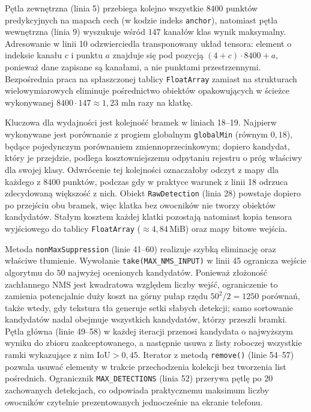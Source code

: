 Pętla zewnętrzna (linia 5) przebiega kolejno wszystkie $8400$ punktów predykcyjnych na mapach cech (w kodzie indeks \texttt{anchor}), natomiast pętla wewnętrzna (linia 9) wyszukuje wśród $147$ kanałów klas wynik maksymalny. Adresowanie w linii 10 odzwierciedla transponowany układ tensora: element o indeksie kanału $c$ i punktu $a$ znajduje się pod pozycją $(4+c)\cdot 8400 + a$, ponieważ dane zapisane są kanałami, a nie punktami przestrzennymi. Bezpośrednia praca na spłaszczonej tablicy \texttt{FloatArray} zamiast na strukturach wielowymiarowych eliminuje pośrednictwo obiektów opakowujących w ścieżce wykonywanej $8400 \cdot 147 \approx 1{,}23$ mln razy na klatkę.

Kluczowa dla wydajności jest kolejność bramek w liniach 18--19. Najpierw wykonywane jest porównanie z progiem globalnym \texttt{globalMin} (równym $0{,}18$), będące pojedynczym porównaniem zmiennoprzecinkowym; dopiero kandydat, który je przejdzie, podlega kosztowniejszemu odpytaniu rejestru o próg właściwy dla swojej klasy. Odwrócenie tej kolejności oznaczałoby odczyt z mapy dla każdego z $8400$ punktów, podczas gdy w praktyce warunek z linii 18 odrzuca zdecydowaną większość z nich. Obiekt \texttt{RawDetection} (linia 28) powstaje dopiero po przejściu obu bramek, więc klatka bez owocników nie tworzy obiektów kandydatów. Stałym kosztem każdej klatki pozostają natomiast kopia tensora wyjściowego do tablicy \texttt{FloatArray} ($\approx4{,}84$\,MiB) oraz mapy bitowe wejścia.

Metoda \texttt{nonMaxSuppression} (linie 41--60) realizuje szybką eliminację oraz właściwe tłumienie. Wywołanie \texttt{take(MAX\_NMS\_INPUT)} w linii 45 ogranicza wejście algorytmu do $50$ najwyżej ocenionych kandydatów. Ponieważ złożoność zachłannego NMS jest kwadratowa względem liczby wejść, ograniczenie to zamienia potencjalnie duży koszt na górny pułap rzędu $50^2/2 = 1250$ porównań, także wtedy, gdy tekstura tła generuje setki słabych detekcji; samo sortowanie kandydatów nadal obejmuje wszystkich kandydatów, którzy przeszli bramki. Pętla główna (linie 49--58) w każdej iteracji przenosi kandydata o najwyższym wyniku do zbioru zaakceptowanego, a następnie usuwa z listy roboczej wszystkie ramki wykazujące z nim $\mathrm{IoU} > 0{,}45$. Iterator z metodą \texttt{remove()} (linie 54--57) pozwala usuwać elementy w trakcie przechodzenia kolekcji bez tworzenia list pośrednich. Ogranicznik \texttt{MAX\_DETECTIONS} (linia 52) przerywa pętlę po $20$ zachowanych detekcjach, co odpowiada praktycznemu maksimum liczby owocników czytelnie prezentowanych jednocześnie na ekranie telefonu.

